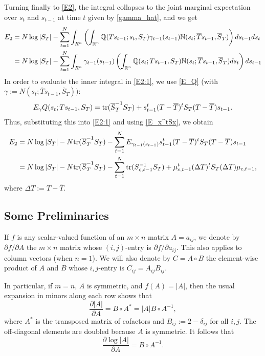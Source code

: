 \documentclass[12pt,leqno]{article}
\begin{document}
 Turning finally to  \eqref{E2}, the integral collapses to the 
joint marginal expectation over $s_t$ and $s_{t-1}$ at time $t$ given by \eqref{gamma_hat}, and we get
\begin{equation}\label{E2:1}
  \begin{split}
    E_2 &= N\log|S_T| - \sum_{t=1}^N\int_{R^n}\left(\int_{{\mathbb R}^{n}}{\mathbb Q}(Ts_{t-1};s_t,S_T)\gamma_{t-1}(s_{t-1}){\mathbb N}(s_t;\overline{T}s_{t-1},
    \overline{S}_T)\right)ds_{t-1}ds_t\\
    &= N\log|S_T| - \sum_{t=1}^N\int_{R^n}\gamma_{t-1}(s_{t-1})\left(\int_{{\mathbb R}^{n}}{\mathbb Q}(s_t;Ts_{t-1},S_T){\mathbb N}(s_t;\overline{T}s_{t-1},
    \overline{S}_T)ds_t\right)ds_{t-1}\\
  \end{split}
  \end{equation}
In order to evaluate the inner integral in \eqref{E2:1}, we use \eqref{E_Q} 
(with $\gamma := N(s_t;\overline{T}s_{t-1},\overline{S}_T))$:
$$
E_{\gamma}Q(s_t;Ts_{t-1},S_T) = \text{\rm tr}(\overline{S}_T^{-1}S_T) + s_{t-1}^t(T - \overline{T})^tS_T(T - \overline{T})s_{t-1}.
$$
Thus, substituting this into \eqref{E2:1} and using \eqref{E_x^tSx}, we obtain
\begin{equation}\label{E2:2}
  \begin{split}
    E_2 &= N\log|S_T| - N\text{\rm tr}(\overline{S}_T^{-1}S_T) - \sum_{t=1}^N E_{\gamma_{t-1}(s_{t-1})}s_{t-1}^t(T - \overline{T})^t
    S_T(T - \overline{T})s_{t-1} \\
    &= N\log|S_T| - N\text{\rm tr}(\overline{S}_T^{-1}S_T) -\sum_{t=1}^N \text{\rm tr}(S_{c,t-1}^{-1}S_T) + \mu_{c,t-1}^t(\Delta{T})^tS_T
    (\Delta{T})\mu_{c,t-1},
  \end{split}
\end{equation}
where $\Delta{T} := T - \overline{T}$.
\subsection{Some Preliminaries}
If $f$ is any scalar-valued function of an $m\times{n}$ matrix $A = a_{ij}$, we denote by $\partial{f}/\partial{A}$ the 
$m\times{n}$ matrix whose $(i,j)$-entry is $\partial{f}/\partial{a_{ij}}$.  This also applies to column vectors
(when $n=1$). We will also denote by $C = A\circ{B}$ the element-wise product of $A$ and $B$ whose $i,j$-entry is
$C_{ij} = A_{ij}B_{ij}$.

In particular, if $m=n$, $A$ is symmetric, and $f(A) = |A|$,  then the usual expansion 
in minors along each row shows that 
$$
\frac{\partial{|A|}}{\partial{A}} = B\circ{A}^* = |A|B\circ{A}^{-1},
$$
where $A^*$ is the transposed matrix of cofactors and $B_{ij} := 2-\delta_{ij}$ for all $i,j$.
The off-diagonal elements are doubled because $A$ is symmetric.
It follows that
\begin{equation}\label{partial_logdet}
  \frac{\partial{\log|A|}}{\partial{A}} = B\circ{A}^{-1}. 
\end{equation}
\end{document}
